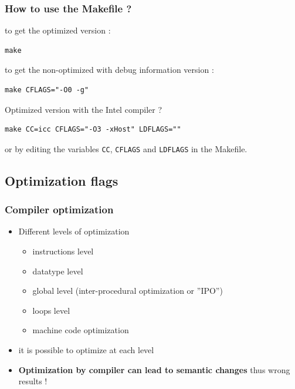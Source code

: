 \begin{frame}[containsverbatim]
\frametitle{How to use the Makefile ?}

to get the optimized version :
\begin{verbatim}
make
\end{verbatim}

to get the non-optimized with debug information version :
\begin{verbatim}
make CFLAGS="-O0 -g"
\end{verbatim}

Optimized version with the Intel compiler ?
\begin{verbatim}
make CC=icc CFLAGS="-O3 -xHost" LDFLAGS=""
\end{verbatim}

or by editing the variables {\tt CC}, {\tt CFLAGS} and {\tt LDFLAGS} in the Makefile.

\end{frame}


\subsection{Optimization flags}


\begin{frame}
\frametitle{Compiler optimization}

\begin{itemize}
	\item Different levels of optimization
	\begin{itemize}
		\item instructions level
		\item datatype level
		\item global level (inter-procedural optimization or ''IPO'')
		\item loops level
		\item machine code optimization
	\end{itemize}
	\item it is possible to optimize at each level
	\item {\bf Optimization by compiler can lead to semantic changes} thus wrong results ! 
\end{itemize}

\end{frame}


